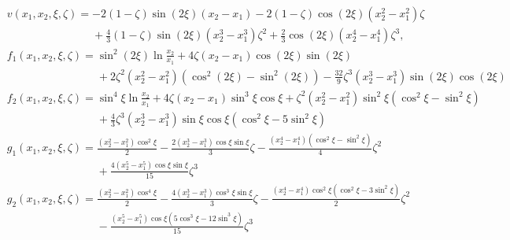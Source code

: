 \documentclass[12pt]{article}
\begin{document}
\begin{subequations}
\begin{align}
&v(x_1,x_2,\xi,\zeta)= -2(1-\zeta)\sin(2\xi)(x_2-x_1)-2(1-\zeta)\cos(2\xi)(x_2^2-x_1^2)\zeta\nonumber\\
&\phantom{v(x_1,x_2,\xi,\zeta)= }+\frac{4}{3}(1-\zeta)\sin(2\xi)(x_2^3-x_1^3)\zeta^2+\frac{2}{3}\cos(2\xi)(x_2^4-x_1^4)\zeta^3,\\
&f_1(x_1,x_2,\xi,\zeta)=\sin^2\left(2\xi\right)\ln\frac{x_2}{x_1}+4\zeta(x_2-x_1)\cos(2\xi)\sin(2\xi)\nonumber\\
&\phantom{f_1(x_1,x_2,\xi,\zeta)=}+2\zeta^2(x_2^2-x_1^2)\left(\cos^2(2\xi)-\sin^2(2\xi)\right)-\frac{32}{9}\zeta^3(x_2^3-x_1^3)\sin(2\xi)\cos(2\xi)\\
&f_2(x_1,x_2,\xi,\zeta)=\sin^4\xi\ln\frac{x_2}{x_1}+4\zeta(x_2-x_1)\sin^3\xi\cos\xi+\zeta^2(x_2^2-x_1^2)\sin^2\xi(\cos^2\xi-\sin^2\xi)\nonumber\\
&\phantom{f_2(x_1,x_2,\xi,\zeta)=}+\frac{4}{3}\zeta^3(x_2^3-x_1^3)\sin\xi\cos\xi\left(\cos^2\xi-5\sin^2\xi\right)\\
&g_1(x_1,x_2,\xi,\zeta)=\frac{(x_2^2-x_1^2)\cos^2\xi}{2}-\frac{2(x_2^3-x_1^3)\cos\xi\sin\xi}{3}\zeta-\frac{(x_2^4-x_1^4)(\cos^2\xi-\sin^2\xi)}{4}\zeta^2\nonumber\\
&\phantom{g_1(x_1,x_2,\xi,\zeta)=}+\frac{4(x_2^5-x_1^5)\cos\xi\sin\xi}{15}\zeta^3\nonumber\\
&g_2(x_1,x_2,\xi,\zeta)=\frac{(x_2^2-x_1^2)\cos^4\xi}{2}-\frac{4(x_2^3-x_1^3)\cos^3\xi\sin\xi}{3}\zeta-\frac{(x_2^4-x_1^4)\cos^2\xi(\cos^2\xi-3\sin^2\xi)}{2}\zeta^2\nonumber\\
&\phantom{g_2(x_1,x_2,\xi,\zeta)=}-\frac{(x_2^5-x_1^5)\cos\xi(5\cos^3\xi-12\sin^3\xi)}{15}\zeta^3
\end{align}
\end{subequations}
\end{document}
